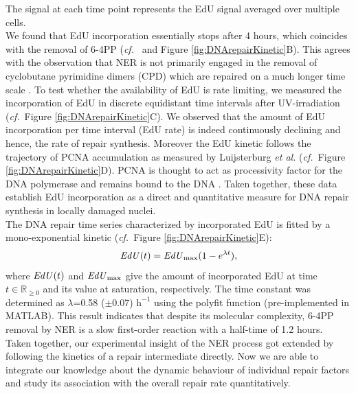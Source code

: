 The signal at each time point represents the EdU signal averaged over multiple cells.\\
We found that EdU incorporation essentially stops after 4 hours, which coincides with the removal of 6-4PP (\textit{cf.}\ \cite{Luijsterburg2010} and Figure \ref{fig:DNArepairKinetic}B). This agrees with the observation that NER is not primarily engaged in the removal of cyclobutane pyrimidine dimers (CPD) which are repaired on a much longer time scale \cite{Luijsterburg2010}. To test whether the availability of EdU is rate limiting, we measured the incorporation of EdU in discrete equidistant time intervals after UV-irradiation (\textit{cf.}\ Figure \ref{fig:DNArepairKinetic}C). We observed that the amount of EdU incorporation per time interval (EdU rate) is indeed continuously declining and hence, the rate of repair synthesis. Moreover the EdU kinetic follows the trajectory of PCNA accumulation as measured by Luijsterburg \textit{et al.} \cite{Luijsterburg2010} (\textit{cf.}\ Figure \ref{fig:DNArepairKinetic}D). PCNA is thought to act as processivity factor for the DNA polymerase and remains bound to the DNA \cite{Luijsterburg2010,Essers2005,Sporbert2002}. Taken together, these data establish EdU incorporation as a direct and quantitative measure for DNA repair synthesis in locally damaged nuclei.\\
The DNA repair time series characterized by incorporated EdU is fitted by a mono-exponential kinetic (\textit{cf.}\ Figure \ref{fig:DNArepairKinetic}E):
\begin{equation}
\text{\textit{EdU}}(t) = \text{\textit{EdU}}_\text{max}(1 - e^{\lambda t}),
\label{Eqn:EdU_kinetic}
\end{equation}  
where $\text{\textit{EdU}}(t)$ and $\text{\textit{EdU}}_{\text{max}}$ give the amount of incorporated EdU at time $t\in \mathds{R}_{\geq 0}$ and its value at saturation, respectively. The time constant was determined as $\lambda$=0.58 ($\pm$0.07) $\text{h}^{-\text{1}}$ using the polyfit function (pre-implemented in MATLAB). This result indicates that despite its molecular complexity, 6-4PP removal by NER is a slow first-order reaction with a half-time of 1.2 hours. \\
        

Taken together, our experimental insight of the NER process got extended by following the kinetics of a repair intermediate directly. Now we are able to integrate our knowledge about the dynamic behaviour of individual repair factors and study its association with the overall repair rate quantitatively.    